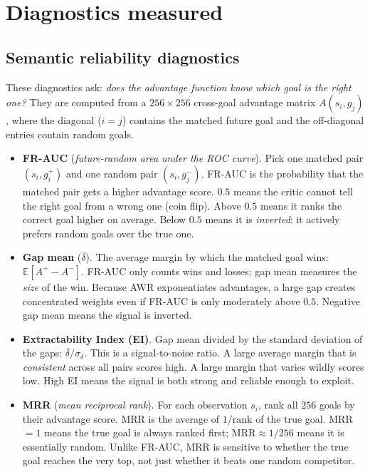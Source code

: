 \documentclass[11pt]{article}
\begin{document}
\section{Diagnostics measured}

\subsection{Semantic reliability diagnostics}

These diagnostics ask: \textit{does the advantage function know which goal is the right one?}
They are computed from a $256\times256$ cross-goal advantage matrix $A(s_i, g_j)$, where the
diagonal ($i=j$) contains the matched future goal and the off-diagonal entries contain random goals.

\begin{itemize}[leftmargin=2em, itemsep=4pt]

  \item \textbf{FR-AUC} (\emph{future-random area under the ROC curve}).
  Pick one matched pair $(s_i, g_i^+)$ and one random pair $(s_i, g_j^-)$.
  FR-AUC is the probability that the matched pair gets a higher advantage score.
  $0.5$ means the critic cannot tell the right goal from a wrong one (coin flip).
  Above $0.5$ means it ranks the correct goal higher on average.
  Below $0.5$ means it is \emph{inverted}: it actively prefers random goals over the true one.

  \item \textbf{Gap mean} ($\overline{\delta}$).
  The average margin by which the matched goal wins: $\mathbb{E}[A^+ - A^-]$.
  FR-AUC only counts wins and losses; gap mean measures the \emph{size} of the win.
  Because AWR exponentiates advantages, a large gap creates concentrated weights even if
  FR-AUC is only moderately above $0.5$. Negative gap mean means the signal is inverted.

  \item \textbf{Extractability Index (EI)}.
  Gap mean divided by the standard deviation of the gaps: $\overline{\delta}/\sigma_\delta$.
  This is a signal-to-noise ratio. A large average margin that is \emph{consistent} across all pairs
  scores high. A large margin that varies wildly scores low. High EI means the signal is
  both strong and reliable enough to exploit.

  \item \textbf{MRR} (\emph{mean reciprocal rank}).
  For each observation $s_i$, rank all $256$ goals by their advantage score.
  MRR is the average of $1/\mathrm{rank}$ of the true goal.
  MRR$=1$ means the true goal is always ranked first; MRR$\approx 1/256$ means it is essentially random.
  Unlike FR-AUC, MRR is sensitive to whether the true goal reaches the very top, not just
  whether it beats one random competitor.


\end{itemize}
\end{document}

